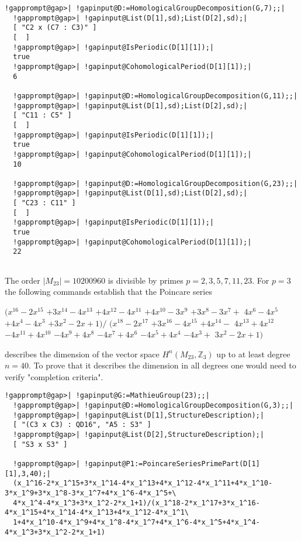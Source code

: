 \documentclass[a4paper,11pt]{report}
\begin{document}
{{\begin{Verbatim}[commandchars=!@|,fontsize=\small,frame=single,label=Example]
  !gapprompt@gap>| !gapinput@D:=HomologicalGroupDecomposition(G,7);;|
  !gapprompt@gap>| !gapinput@List(D[1],sd);List(D[2],sd);|
  [ "C2 x (C7 : C3)" ]
  [  ]
  !gapprompt@gap>| !gapinput@IsPeriodic(D[1][1]);|
  true
  !gapprompt@gap>| !gapinput@CohomologicalPeriod(D[1][1]);|
  6
  
  !gapprompt@gap>| !gapinput@D:=HomologicalGroupDecomposition(G,11);;|
  !gapprompt@gap>| !gapinput@List(D[1],sd);List(D[2],sd);|
  [ "C11 : C5" ]
  [  ]
  !gapprompt@gap>| !gapinput@IsPeriodic(D[1][1]);|
  true
  !gapprompt@gap>| !gapinput@CohomologicalPeriod(D[1][1]);|
  10
  
  !gapprompt@gap>| !gapinput@D:=HomologicalGroupDecomposition(G,23);;|
  !gapprompt@gap>| !gapinput@List(D[1],sd);List(D[2],sd);|
  [ "C23 : C11" ]
  [  ]
  !gapprompt@gap>| !gapinput@IsPeriodic(D[1][1]);|
  true
  !gapprompt@gap>| !gapinput@CohomologicalPeriod(D[1][1]);|
  22
  
\end{Verbatim}
 

The order $|M_{23}|=10200960$ is divisible by primes $p=2, 3, 5, 7, 11, 23$. For $p=3$ the following commands establish that the Poincare series 

$(x^{16} - 2x^{15}$ $ + 3x^{14} - 4x^{13}$ $ + 4x^{12} - 4x^{11}$ $ + 4x^{10} - 3x^9$ $ + 3x^8 - 3x^7 +$ $ 4x^6 - 4x^5 $ $+ 4x^4 -4x^3$ $ + 3x^2 -2x + 1) /$ $ (x^{18} - 2x^{17}$ $ + 3x^{16} - 4x^{15}$ $ + 4x^{14} - $ $4x^{13} + 4x^{12}$ $ - 4x^{11} + 4x^{10}$ $ - 4x^9 + 4x^8$ $ - 4x^7 + 4x^6 $ $ - 4x^5 + 4x^4$ $ - 4x^3 +$ $ 3x^2 - 2x + 1)$ 

describes the dimension of the vector space $H^n(M_{23},\mathbb Z_3)$ up to at least degree $n=40$. To prove that it describes the dimension in all degrees one would need to
verify "completion criteria". 
\begin{Verbatim}[commandchars=!@|,fontsize=\small,frame=single,label=Example]
  !gapprompt@gap>| !gapinput@G:=MathieuGroup(23);;|
  !gapprompt@gap>| !gapinput@D:=HomologicalGroupDecomposition(G,3);;|
  !gapprompt@gap>| !gapinput@List(D[1],StructureDescription);|
  [ "(C3 x C3) : QD16", "A5 : S3" ]
  !gapprompt@gap>| !gapinput@List(D[2],StructureDescription);|
  [ "S3 x S3" ]
  
  !gapprompt@gap>| !gapinput@P1:=PoincareSeriesPrimePart(D[1][1],3,40);|
  (x_1^16-2*x_1^15+3*x_1^14-4*x_1^13+4*x_1^12-4*x_1^11+4*x_1^10-3*x_1^9+3*x_1^8-3*x_1^7+4*x_1^6-4*x_1^5+\
  4*x_1^4-4*x_1^3+3*x_1^2-2*x_1+1)/(x_1^18-2*x_1^17+3*x_1^16-4*x_1^15+4*x_1^14-4*x_1^13+4*x_1^12-4*x_1^1\
  1+4*x_1^10-4*x_1^9+4*x_1^8-4*x_1^7+4*x_1^6-4*x_1^5+4*x_1^4-4*x_1^3+3*x_1^2-2*x_1+1)
  

\end{Verbatim}}}
\end{document}

